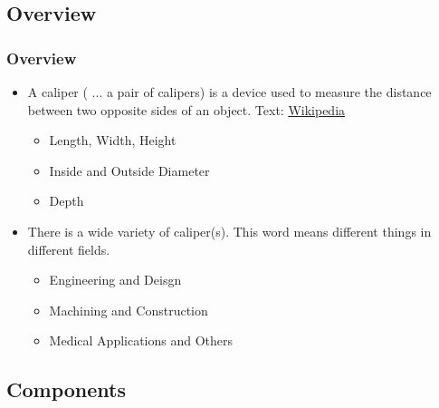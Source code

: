 \documentclass[fleqn]{beamer} %
\newcommand{\sectionIsubsectionItitle}{Overview}
\newcommand{\sectionIsubsectionIItitle}{Components}
\begin{document}
		\subsection{\sectionIsubsectionItitle}\label{sectionIsubsectionI}

			\begin{frame}
				\frametitle{\sectionIsubsectionItitle}
				\begin{itemize}

					\item A caliper ( ... a pair of calipers) is a device used to measure the distance between two opposite sides of an object. {\tiny Text: \href{https://en.wikipedia.org/wiki/Calipers}{Wikipedia}}
					\begin{itemize}

						\item Length, Width, Height
						\item Inside and Outside Diameter
						\item Depth 

					\end{itemize}

					\vspace{5mm}
					\item There is a wide variety of caliper(s). This word means different things in different fields. 
					\begin{itemize}

						\item Engineering and Deisgn
						\item Machining and Construction
						\item Medical Applications and Others

					\end{itemize}

				\end{itemize}

			\end{frame}

		\subsection{\sectionIsubsectionIItitle}\label{sectionIsubsectionII}
\end{document}
